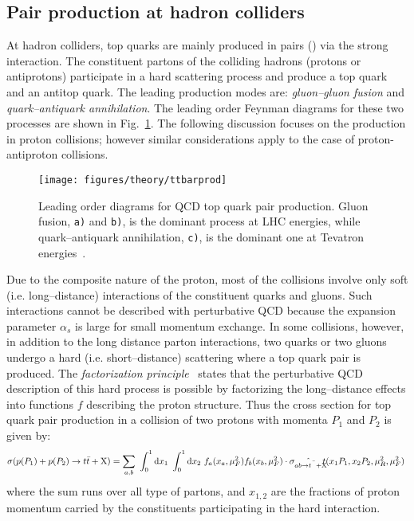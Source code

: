 \subsection{Pair production at hadron colliders}
\label{sec:topprod}

At hadron colliders, top quarks are mainly produced in pairs
(\ttbar{}) via the strong interaction. The constituent partons of the
colliding hadrons (protons or antiprotons) participate in a hard
scattering process and produce a top quark and an antitop quark. The
leading production modes are: {\it gluon--gluon fusion} and {\it
  quark--antiquark annihilation}. The leading order Feynman diagrams
for these two processes are shown in Fig.~\ref{fig:ttbarprod}. The
following discussion focuses on the \ttbar{} production in proton
collisions; however similar considerations apply to the case of
proton-antiproton collisions.

\begin{figure}[!htb]\centering
  \texttt{[image: figures/theory/ttbarprod]}
  \caption{Leading order diagrams for QCD top quark pair production.
    Gluon fusion, {\tt a)} and {\tt b)}, is the dominant process at
    LHC energies, while quark--antiquark annihilation, {\tt c)}, is
    the dominant one at Tevatron energies~\cite{Fiorini:2012fe}.} 
  \label{fig:ttbarprod}
\end{figure}

Due to the composite nature of the proton, most of the
collisions involve only soft (i.e. long--distance) interactions of the
constituent quarks and gluons. Such interactions cannot be described
with perturbative QCD because the expansion parameter $\alpha_s$ is
large for small momentum exchange.
In some collisions, however, in addition to the long distance parton
interactions, two quarks or two gluons undergo a hard (i.e. short--distance) scattering where a top quark pair is produced. 
The {\it factorization principle}~\cite{factorprinciple} states that
the perturbative QCD description of this hard process is possible by
factorizing the long--distance effects into functions $f$ describing the
proton structure. Thus the cross section for top quark pair
production in a collision of two protons with momenta $P_1$ and $P_2$
is given by: 
\begin{equation}
  \sigma(p(P_1)+p(P_2)\to t\bar{t}{}+{\rm X})
  = 
  \sum_{a,b}
  ~\int_0^1{\rm d}x_1
  ~\int_0^1{\rm d}x_2
  ~ f_a(x_a,\mu_F^2{}) f_b(x_b,\mu_F^2)
  \cdot{}\hat{\sigma_{ab\to t\bar{t}{}+\rm{X}}}(x_1P_1,x_2P_2,\mu_R^2{},\mu_F^2{})
  \phantom{,}
  \label{eq:ttbarxs}
\end{equation}
where the sum runs over all type of partons, and $x_{1,2}$ are the
fractions of proton momentum carried by the constituents participating
in the hard interaction. 

